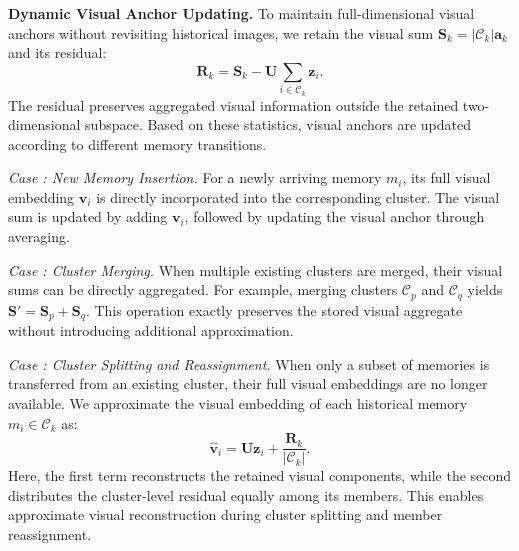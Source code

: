 \noindent \textbf{Dynamic Visual Anchor Updating.}
To maintain full-dimensional visual anchors without revisiting historical images, we retain the visual sum $\mathbf{S}_k=|\mathcal{C}_k|\mathbf{a}_k$ and its residual:
\begin{equation}
    \mathbf{R}_k =
    \mathbf{S}_k -
    \mathbf{U}\sum_{i\in\mathcal{C}_k}\mathbf{z}_i.
\end{equation}
The residual preserves aggregated visual information outside the retained two-dimensional subspace.
Based on these statistics, visual anchors are updated according to different memory transitions.

\textit{Case : New Memory Insertion.}
For a newly arriving memory $m_i$, its full visual embedding $\mathbf{v}_i$ is directly incorporated into the corresponding cluster.
The visual sum is updated by adding $\mathbf{v}_i$, followed by updating the visual anchor through averaging.

\textit{Case : Cluster Merging.}
When multiple existing clusters are merged, their visual sums can be directly aggregated.
For example, merging clusters $\mathcal{C}_p$ and $\mathcal{C}_q$ yields
$\mathbf{S}'=\mathbf{S}_p+\mathbf{S}_q$.
This operation exactly preserves the stored visual aggregate without introducing additional approximation.

\textit{Case : Cluster Splitting and Reassignment.}
When only a subset of memories is transferred from an existing cluster, their full visual embeddings are no longer available.
We approximate the visual embedding of each historical memory $m_i\in\mathcal{C}_k$ as:
\begin{equation}
\label{eq:vamo-leaf-reconstruction}
    \hat{\mathbf{v}}_i =
    \mathbf{U}\mathbf{z}_i +
    \frac{\mathbf{R}_k}{|\mathcal{C}_k|}.
\end{equation}
Here, the first term reconstructs the retained visual components, while the second distributes the cluster-level residual equally among its members.
This enables approximate visual reconstruction during cluster splitting and member reassignment.

